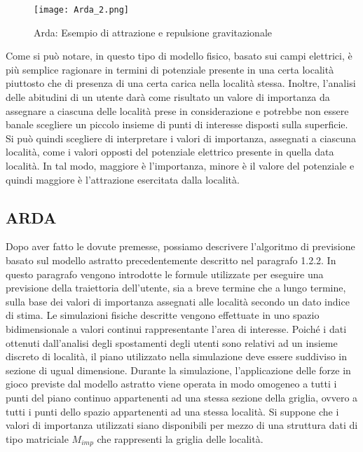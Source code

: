 \begin{figure}
\begin{center}
\texttt{[image: Arda\_2.png]}
\caption[Arda 2]{Arda: Esempio di attrazione e repulsione gravitazionale}
\label{etichetta}
\end{center}
\end{figure}

Come si pu\`o notare, in questo tipo di modello fisico, basato sui campi
elettrici, \`e pi\`u semplice ragionare in termini di potenziale presente in una
certa localit\`a piuttosto che di presenza di una certa carica nella localit\`a stessa.
Inoltre, l'analisi delle abitudini di un utente dar\`a come risultato un valore di
importanza da assegnare a ciascuna delle localit\`a prese in considerazione e
potrebbe non essere banale scegliere un piccolo insieme di punti di interesse
disposti sulla superficie. Si pu\`o quindi scegliere di interpretare i valori
di importanza, assegnati a ciascuna localit\`a, come i valori opposti del potenziale
elettrico presente in quella data localit\`a. In tal modo, maggiore \`e l'importanza,
minore \`e il valore del potenziale e quindi maggiore \`e l'attrazione esercitata dalla localit\`a.

\subsection{ARDA}
Dopo aver fatto le dovute premesse, possiamo descrivere l'algoritmo di previsione
basato sul modello astratto precedentemente descritto nel paragrafo 1.2.2.
In questo paragrafo vengono introdotte le formule utilizzate per eseguire una previsione
della traiettoria dell'utente, sia a breve termine che a lungo termine, sulla base
dei valori di importanza assegnati alle localit\`a secondo un dato indice di stima.
Le simulazioni fisiche descritte vengono effettuate in uno spazio bidimensionale
a valori continui rappresentante l'area di interesse. Poich\'e i dati ottenuti
dall'analisi degli spostamenti degli utenti sono relativi ad un insieme
discreto di localit\`a, il piano utilizzato nella simulazione deve essere
suddiviso in sezione di ugual dimensione. Durante la simulazione, l'applicazione
delle forze in gioco previste dal modello astratto viene operata in modo omogeneo
a tutti i punti del piano continuo appartenenti ad una stessa sezione della griglia,
ovvero a tutti i punti dello spazio appartenenti ad una stessa localit\`a.
Si suppone che i valori di importanza utilizzati siano disponibili per mezzo
di una struttura dati di tipo matriciale $M_{imp}$ che rappresenti la griglia delle
localit\`a.

